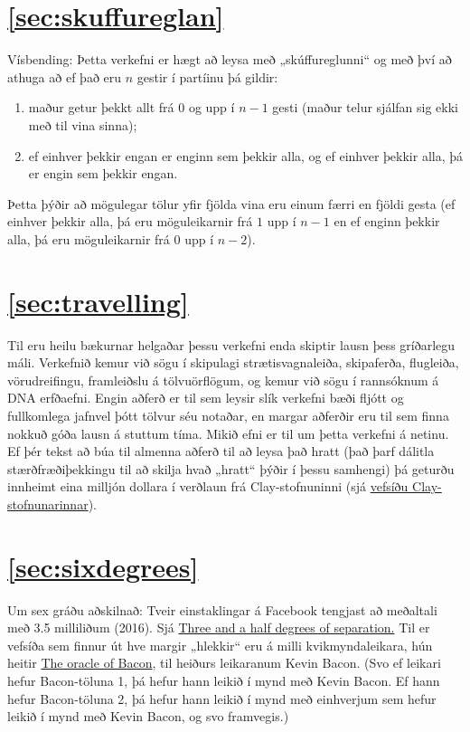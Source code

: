 \documentclass[b5paper,12pt]{book}
\begin{document}
\section*{\ref{sec:skuffureglan}}
Vísbending: Þetta verkefni er hægt að leysa með „skúffureglunni“ og með því að athuga að ef það eru $n$ gestir í partíinu þá gildir: 
\begin{enumerate}
\item maður getur þekkt allt frá $0$ og upp í $n-1$ gesti (maður telur sjálfan sig ekki með til vina sinna);
\item ef einhver þekkir engan er enginn sem þekkir alla, og ef einhver þekkir alla, þá er engin sem þekkir engan.
\end{enumerate}
Þetta þýðir að mögulegar tölur yfir fjölda vina eru einum færri en fjöldi gesta (ef einhver þekkir alla, þá eru möguleikarnir frá $1$ upp í $n-1$ en ef enginn þekkir alla, þá eru möguleikarnir frá $0$ upp í $n-2$).

\section*{\ref{sec:travelling}}
Til eru heilu bækurnar helgaðar þessu verkefni enda skiptir lausn þess gríðarlegu máli. Verkefnið kemur við sögu í skipulagi strætisvagnaleiða, skipaferða, flugleiða, vörudreifingu, framleiðslu á tölvuörflögum, og kemur við sögu í rannsóknum á DNA erfðaefni. Engin aðferð er til sem leysir slík verkefni bæði fljótt og fullkomlega jafnvel þótt tölvur séu notaðar, en margar aðferðir eru til sem finna nokkuð góða lausn á stuttum tíma. Mikið efni er til um þetta verkefni á netinu. Ef þér tekst að búa til almenna aðferð til að leysa það hratt (það þarf dálitla stærðfræðiþekkingu til að skilja hvað „hratt“ þýðir í þessu samhengi) þá geturðu innheimt eina milljón dollara í verðlaun frá Clay-stofnuninni (sjá \href{https://plus.maths.org/content/travelling-salesman}{vefsíðu Clay-stofnunarinnar}).

\section*{\ref{sec:sixdegrees}}
Um sex gráðu aðskilnað: Tveir einstaklingar á Facebook tengjast að meðaltali með 3.5 milliliðum (2016). Sjá \href{https://research.fb.com/three-and-a-half-degrees-of-separation/}{Three and a half degrees of separation.} Til er vefsíða sem finnur út hve margir „hlekkir“ eru á milli kvikmyndaleikara, hún heitir \href{https://oracleofbacon.org/}{The oracle of Bacon}, til heiðurs leikaranum Kevin Bacon. (Svo ef leikari hefur Bacon-töluna 1, þá hefur hann leikið í mynd með Kevin Bacon. Ef hann hefur Bacon-töluna 2, þá hefur hann leikið í mynd með einhverjum sem hefur leikið í mynd með Kevin Bacon, og svo framvegis.)
\end{document}

